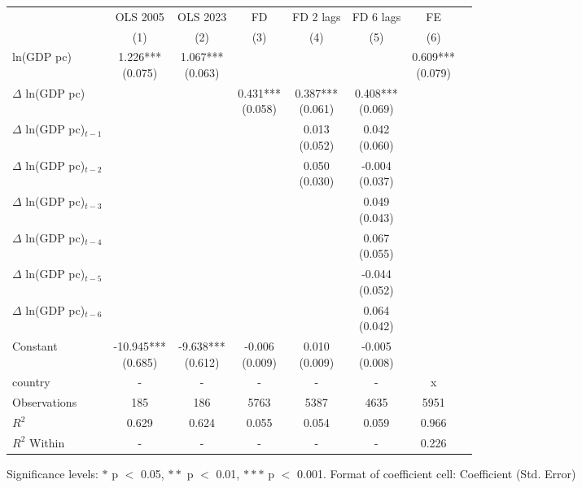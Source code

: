 \renewcommand\cellalign{t}
\begin{threeparttable}
\begin{tabular}{lccccccc}
\toprule
 & OLS 2005 & OLS 2023 & FD & FD 2 lags & FD 6 lags & FE \\
 & (1) & (2) & (3) & (4) & (5) & (6) \\
\midrule
\addlinespace
ln(GDP pc) & \makecell{1.226*** \\ (0.075)} & \makecell{1.067*** \\ (0.063)} &  &  &  & \makecell{0.609*** \\ (0.079)} \\
$\Delta$ ln(GDP pc) &  &  & \makecell{0.431*** \\ (0.058)} & \makecell{0.387*** \\ (0.061)} & \makecell{0.408*** \\ (0.069)} &  \\
$\Delta$ ln(GDP pc)$_{t-1}$ &  &  &  & \makecell{0.013 \\ (0.052)} & \makecell{0.042 \\ (0.060)} &  \\
$\Delta$ ln(GDP pc)$_{t-2}$ &  &  &  & \makecell{0.050 \\ (0.030)} & \makecell{-0.004 \\ (0.037)} &  \\
$\Delta$ ln(GDP pc)$_{t-3}$ &  &  &  &  & \makecell{0.049 \\ (0.043)} &  \\
$\Delta$ ln(GDP pc)$_{t-4}$ &  &  &  &  & \makecell{0.067 \\ (0.055)} &  \\
$\Delta$ ln(GDP pc)$_{t-5}$ &  &  &  &  & \makecell{-0.044 \\ (0.052)} &  \\
$\Delta$ ln(GDP pc)$_{t-6}$ &  &  &  &  & \makecell{0.064 \\ (0.042)} &  \\
Constant & \makecell{-10.945*** \\ (0.685)} & \makecell{-9.638*** \\ (0.612)} & \makecell{-0.006 \\ (0.009)} & \makecell{0.010 \\ (0.009)} & \makecell{-0.005 \\ (0.008)} &  \\
\midrule
\addlinespace
country & - & - & - & - & - & x \\
\midrule
\addlinespace
Observations & 185 & 186 & 5763 & 5387 & 4635 & 5951 \\
$R^2$ & 0.629 & 0.624 & 0.055 & 0.054 & 0.059 & 0.966 \\
$R^2$ Within & - & - & - & - & - & 0.226 \\
\bottomrule
\end{tabular}
\footnotesize Significance levels: $*$ p $<$ 0.05, $**$ p $<$ 0.01, $***$ p $<$ 0.001. Format of coefficient cell: Coefficient 
 (Std. Error)
\end{threeparttable}
